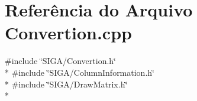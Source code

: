 \section{Referência do Arquivo Convertion.\+cpp}
\label{_convertion_8cpp}
{\ttfamily \#include \char`\"{}S\+I\+G\+A/\+Convertion.\+h\char`\"{}}\\*
{\ttfamily \#include \char`\"{}S\+I\+G\+A/\+Column\+Information.\+h\char`\"{}}\\*
{\ttfamily \#include \char`\"{}S\+I\+G\+A/\+Draw\+Matrix.\+h\char`\"{}}\\*
